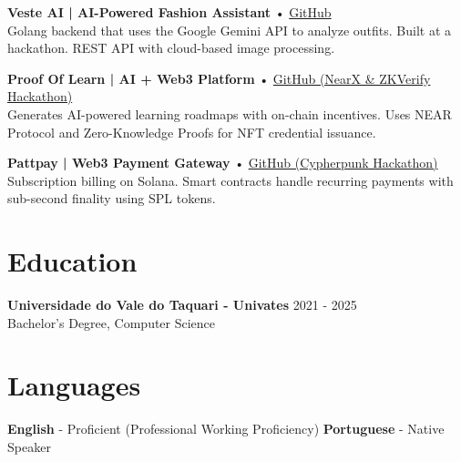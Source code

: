 \documentclass[10pt,a4paper]{article}
\begin{document}
\vspace{2pt}
\noindent\textbf{\footnotesize Veste AI | AI-Powered Fashion Assistant} • {\footnotesize\href{https://github.com/Dnreikronos/HB02-2025_braindancers}{GitHub}}\\
{\footnotesize Golang backend that uses the Google Gemini API to analyze outfits. Built at a hackathon. REST API with cloud-based image processing.}

\vspace{2pt}
\noindent\textbf{\footnotesize Proof Of Learn | AI + Web3 Platform} • {\footnotesize\href{https://github.com/Dnreikronos/proof-of-learn}{GitHub (NearX \& ZKVerify Hackathon)}}\\
{\footnotesize Generates AI-powered learning roadmaps with on-chain incentives. Uses NEAR Protocol and Zero-Knowledge Proofs for NFT credential issuance.}

\vspace{2pt}
\noindent\textbf{\footnotesize Pattpay | Web3 Payment Gateway} • {\footnotesize\href{https://github.com/Dnreikronos/pattpay}{GitHub (Cypherpunk Hackathon)}}\\
{\footnotesize Subscription billing on Solana. Smart contracts handle recurring payments with sub-second finality using SPL tokens.}

\section{Education}

\vspace{2pt}
\noindent\textbf{\footnotesize Universidade do Vale do Taquari - Univates} \hfill {\footnotesize 2021 - 2025}\\
{\footnotesize Bachelor's Degree, Computer Science}

\section{Languages}

\vspace{2pt}
\begin{center}
{\footnotesize \textbf{English} - Proficient (Professional Working Proficiency) \quad\quad \textbf{Portuguese} - Native Speaker}
\end{center}
\end{document}

